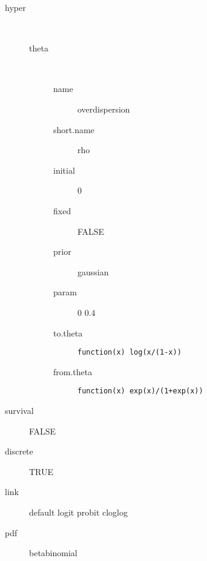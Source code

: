 \begin{description}
	\item[hyper]\ 
	 \begin{description}
	 	\item[theta]\ 
	 	 \begin{description}
	 	 	\item[name] overdispersion
	 	 	\item[short.name] rho
	 	 	\item[initial] 0
	 	 	\item[fixed] FALSE
	 	 	\item[prior] gaussian
	 	 	\item[param] 0 0.4
	 	 	\item[to.theta] \verb|function(x) log(x/(1-x))|
	 	 	\item[from.theta] \verb|function(x) exp(x)/(1+exp(x))|
	 	 \end{description}
	 \end{description}
	\item[survival] FALSE
	\item[discrete] TRUE
	\item[link] default logit probit cloglog
	\item[pdf] betabinomial
\end{description}
